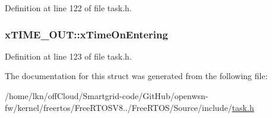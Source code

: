 Definition at line 122 of file task.\+h.

\subsubsection[{\texorpdfstring{x\+Time\+On\+Entering}{xTimeOnEntering}}]{ x\+T\+I\+M\+E\+\_\+\+O\+U\+T\+::x\+Time\+On\+Entering}\hypertarget{structx_t_i_m_e___o_u_t_a3464939ca050f7bcc6ffe0d8d3766337}{}\label{structx_t_i_m_e___o_u_t_a3464939ca050f7bcc6ffe0d8d3766337}


Definition at line 123 of file task.\+h.



The documentation for this struct was generated from the following file\+:\begin{DoxyCompactItemize}
\item 
/home/lkn/off\+Cloud/\+Smartgrid-\/code/\+Git\+Hub/openwsn-\/fw/kernel/freertos/\+Free\+R\+T\+O\+S\+V8../\+Free\+R\+T\+O\+S/\+Source/include/\hyperlink{task_8h}{task.\+h}\end{DoxyCompactItemize}
